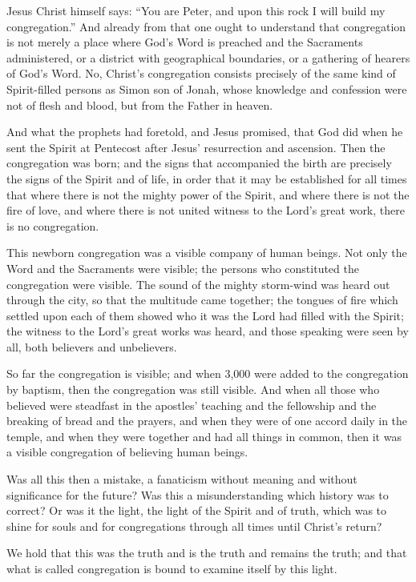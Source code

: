 Jesus Christ himself says: “You are Peter, and upon this rock I will build my congregation.” And already from that one ought to understand that congregation is not merely a place where God’s Word is preached and the Sacraments administered, or a district with geographical boundaries, or a gathering of hearers of God’s Word. No, Christ’s congregation consists precisely of the same kind of Spirit-filled persons as Simon son of Jonah, whose knowledge and confession were not of flesh and blood, but from the Father in heaven.

And what the prophets had foretold, and Jesus promised, that God did when he sent the Spirit at Pentecost after Jesus’ resurrection and ascension. Then the congregation was born; and the signs that accompanied the birth are precisely the signs of the Spirit and of life, in order that it may be established for all times that where there is not the mighty power of the Spirit, and where there is not the fire of love, and where there is not united witness to the Lord’s great work, there is no congregation.

This newborn congregation was a visible company of human beings. Not only the Word and the Sacraments were visible; the persons who constituted the congregation were visible. The sound of the mighty storm-wind was heard out through the city, so that the multitude came together; the tongues of fire which settled upon each of them showed who it was the Lord had filled with the Spirit; the witness to the Lord’s great works was heard, and those speaking were seen by all, both believers and unbelievers.

So far the congregation is visible; and when 3,000 were added to the congregation by baptism, then the congregation was still visible. And when all those who believed were steadfast in the apostles’ teaching and the fellowship and the breaking of bread and the prayers, and when they were of one accord daily in the temple, and when they were together and had all things in common, then it was a visible congregation of believing human beings.

Was all this then a mistake, a fanaticism without meaning and without significance for the future? Was this a misunderstanding which history was to correct? Or was it the light, the light of the Spirit and of truth, which was to shine for souls and for congregations through all times until Christ’s return?

We hold that this was the truth and is the truth and remains the truth; and that what is called congregation is bound to examine itself by this light.

